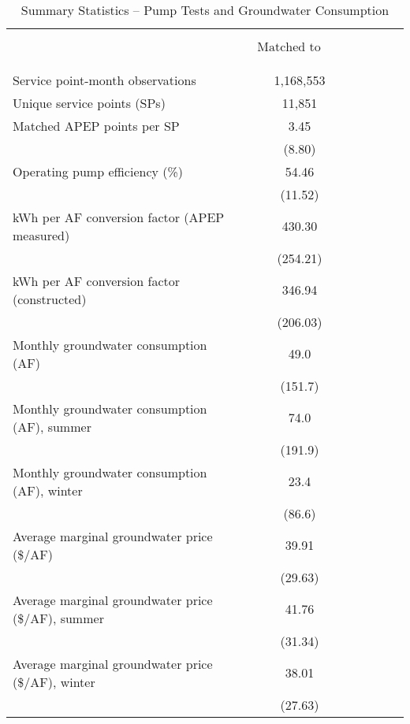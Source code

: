 \begin{table}\centering
\caption{\normalsize Summary Statistics -- Pump Tests and Groundwater Consumption}
\label{tab:water_summary_stats}
\begin{tabular}{lrcrcrr}
\hline
\hline
\\ 
\vspace{-8mm}
\\
&& $\begin{matrix}\text{Matched to Pumps}\end{matrix}$ \\
[.1em]
\cline{2-3}
\\
\vspace{-7mm}
\\
Service point-month observations && 1,168,553 \\ 
[.2em]
Unique service points (SPs) && 11,851 \\ 
[1.4em]
Matched APEP points per SP && 3.45 \\ 
 && (8.80) \\
[.4em]
Operating pump efficiency (\%) && 54.46   \\
 && (11.52)   \\
[.4em]
kWh per AF conversion factor (APEP measured) && 430.30   \\
 && (254.21)   \\
[.4em]
kWh per AF conversion factor (constructed) && 346.94   \\
 && (206.03)   \\
[1.4em]
Monthly groundwater consumption (AF) && 49.0   \\
 && (151.7)   \\
[.4em]
Monthly groundwater consumption (AF), summer && 74.0   \\
 && (191.9)   \\
[.4em]
Monthly groundwater consumption (AF), winter && 23.4   \\
 && (86.6)   \\
[1.4em]
Average marginal groundwater price (\$/AF) && 39.91   \\
 && (29.63)   \\
[.4em]
Average marginal groundwater price (\$/AF), summer && 41.76   \\
 && (31.34)   \\
[.4em]
Average marginal groundwater price (\$/AF), winter && 38.01   \\
 && (27.63)   \\
[.2em]
\hline
\end{tabular}
\captionsetup{width=.93\textwidth}

\end{table}
